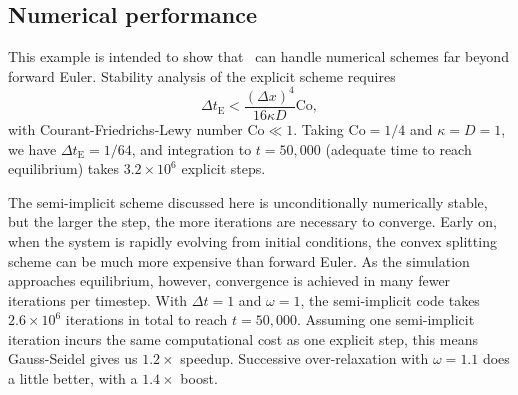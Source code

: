 	
	\subsection{Numerical performance}
	This example is intended to show that \MMSP\ can handle numerical schemes far beyond forward Euler.
	Stability analysis of the explicit scheme requires 
	\[\Delta t_\mathrm{E} < \frac{(\Delta x)^4}{16\kappa D}\mathrm{Co},\]
	with Courant-Friedrichs-Lewy number $\mathrm{Co}\ll 1$.
	Taking $\mathrm{Co}=1/4$ and $\kappa=D=1$, we have $\Delta t_\mathrm{E}=1/64$, and
	integration to $t=50,\!000$ (adequate time to reach equilibrium) takes $3.2\times10^6$ explicit steps.
	
	The semi-implicit scheme discussed here is unconditionally numerically stable, but the larger the step, the more iterations are necessary to converge.
	Early on, when the system is rapidly evolving from initial conditions, the convex splitting scheme can be much more
	expensive than forward Euler.
	As the simulation approaches equilibrium, however, convergence is achieved in many fewer iterations per timestep.
	With $\Delta t=1$ and $\omega=1$, the semi-implicit code takes $2.6\times10^6$ iterations in total to reach $t=50,\!000$.
	Assuming one semi-implicit iteration incurs the same computational cost as one explicit step, this means Gauss-Seidel gives us $1.2\times$ speedup.
	Successive over-relaxation with $\omega=1.1$ does a little better, with a $1.4\times$ boost.

